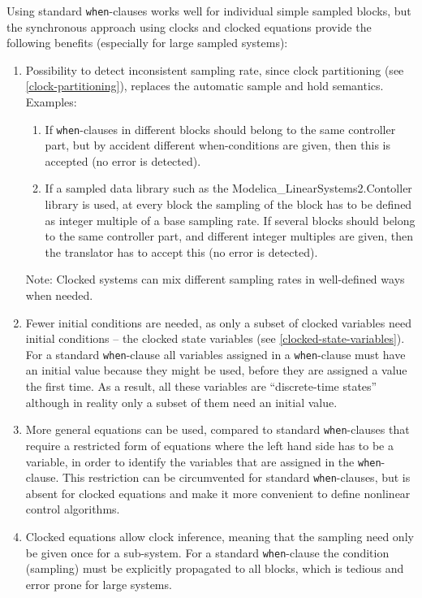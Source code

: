 \begin{nonnormative}
Using standard \lstinline!when!-clauses works well for individual simple sampled blocks, but the synchronous approach using clocks and clocked equations provide the following benefits (especially for large sampled systems):
\begin{enumerate}
\item
  Possibility to detect inconsistent sampling rate, since clock partitioning (see \cref{clock-partitioning}), replaces the automatic sample and hold semantics.
  Examples:
  \begin{enumerate}
  \def\labelenumii{\alph{enumii}.}
  \item
    If \lstinline!when!-clauses in different blocks should belong to the same controller part, but by accident different when-conditions are given, then this is accepted (no error is detected).
  \item
    If a sampled data library such as the Modelica\_LinearSystems2.Contoller library is used, at every block the sampling of the block has to be defined as integer multiple of a base sampling rate.
    If several blocks should belong to the same controller part, and different integer multiples are given, then the translator has to accept this (no error is detected).
  \end{enumerate}
  Note: Clocked systems can mix different sampling rates in well-defined ways when needed.
\item
  Fewer initial conditions are needed, as only a subset of clocked variables need initial conditions -- the clocked state variables (see \cref{clocked-state-variables}).
  For a standard \lstinline!when!-clause all variables assigned in a \lstinline!when!-clause must have an initial value because they might be used, before they are assigned a value the first time.
  As a result, all these variables are ``discrete-time states'' although in reality only a subset of them need an initial value.
\item
  More general equations can be used, compared to standard \lstinline!when!-clauses that require a restricted form of equations where the left hand side has to be a variable, in order to identify the variables that are assigned in the \lstinline!when!-clause.
  This restriction can be circumvented for standard \lstinline!when!-clauses, but is absent for clocked equations and make it more convenient to define nonlinear control algorithms.
\item
  Clocked equations allow clock inference, meaning that the sampling need only be given once for a sub-system.
  For a standard \lstinline!when!-clause the condition (sampling) must be explicitly propagated to all blocks, which is tedious and error prone for large systems.

\end{enumerate}
\end{nonnormative}
